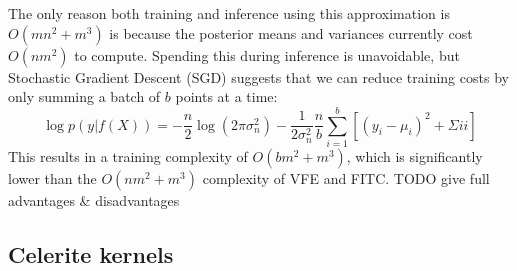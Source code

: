 The only reason both training and inference using this approximation is $O(mn^2 + m^3)$ is because the posterior means and variances currently cost $O(nm^2)$ to compute. Spending this during inference is unavoidable, but Stochastic Gradient Descent (SGD) \cite{adam} suggests that we can reduce training costs by only summing a batch of $b$ points at a time:
\begin{equation*}
    \log p(y | f(X)) = -\frac{n}{2} \log(2 \pi \sigma_n^2) - \frac{1}{2\sigma_n^2} \frac{n}{b} \sum_{i=1}^{b} \left[ (y_i - \mu_i)^2 + \Sigma{ii} \right]
\end{equation*}
This results in a training complexity of $O(bm^2 + m^3)$, which is significantly lower than the $O(nm^2 + m^3)$ complexity of VFE and FITC. TODO give full advantages \& disadvantages






% 
% 
% 

\subsection{Celerite kernels \cite{foreman-mackay}}


